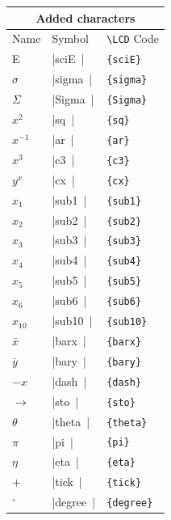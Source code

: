 \documentclass[a4paper,12pt]{article}
\newcommand{\LCDsymb}[1]{\large \textLCD{1}|{#1}~|}
\begin{document}
\begin{center}
	\begin{longtable}{|l|l|l|}
		\multicolumn{3}{c}{\textbf{Added characters}} \\
		\hline
		Name             & Symbol              & \verb|\LCD| \textnormal{Code} \\
		\hline
		E                & \LCDsymb{sciE}      & \verb|{sciE}| \\
		$\sigma$         & \LCDsymb{sigma}     & \verb|{sigma}| \\
		$\Sigma$         & \LCDsymb{Sigma}     & \verb|{Sigma}| \\
		$x^2$            & \LCDsymb{sq}        & \verb|{sq}| \\
		$x^{-1}$         & \LCDsymb{ar}        & \verb|{ar}| \\
		$x^3$            & \LCDsymb{c3}        & \verb|{c3}| \\
		$y^x$            & \LCDsymb{cx}        & \verb|{cx}| \\
		$x_1$            & \LCDsymb{sub1}      & \verb|{sub1}| \\
		$x_2$            & \LCDsymb{sub2}      & \verb|{sub2}| \\
		$x_3$            & \LCDsymb{sub3}      & \verb|{sub3}| \\
		$x_4$            & \LCDsymb{sub4}      & \verb|{sub4}| \\
		$x_5$            & \LCDsymb{sub5}      & \verb|{sub5}| \\
		$x_6$            & \LCDsymb{sub6}      & \verb|{sub6}| \\
		$x_{10}$         & \LCDsymb{sub10}     & \verb|{sub10}| \\
		$\bar x$         & \LCDsymb{barx}      & \verb|{barx}| \\
		$\bar y$         & \LCDsymb{bary}      & \verb|{bary}| \\
		$-x$             & \LCDsymb{dash}      & \verb|{dash}| \\
		$\rightarrow$    & \LCDsymb{sto}       & \verb|{sto}| \\
		$\theta$         & \LCDsymb{theta}     & \verb|{theta}| \\
		$\pi$            & \LCDsymb{pi}        & \verb|{pi}| \\
		$\eta$           & \LCDsymb{eta}       & \verb|{eta}| \\
		$+$              & \LCDsymb{tick}      & \verb|{tick}| \\
		$^\circ$         & \LCDsymb{degree}    & \verb|{degree}| \\

\end{longtable}
\end{center}
\end{document}

